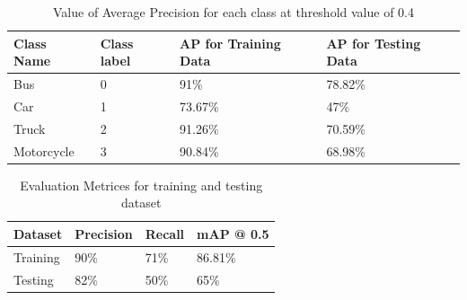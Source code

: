 \begin{table}[H]
	\caption{Value of Average Precision for each class at threshold value of 0.4}
	\label{table:5.1}
	  \begin{center}
		\scalebox{.85}
		{\begin{tabular}{|l |l |l |l |}
	    \hline
	    Class Name  & Class label  & AP for Training Data & AP for Testing Data
		\\ \hline
		Bus &  0 & 91\% & 78.82\%
		\\ \hline
		Car & 1 & 73.67\% & 47\%
		\\ \hline  
		Truck & 2 & 91.26\% & 70.59\%
		\\ \hline  
	    Motorcycle & 3 & 90.84\% & 68.98\%
	    \\ \hline 
		\end{tabular}}
	  \end{center}
\end{table}

\begin{table}[H]
	\caption{Evaluation Metrices for training and testing dataset}
	\label{table:5.2}
	  \begin{center}
		\scalebox{1}
		{\begin{tabular}{|l |l |l |l |}
	    \hline
	    Dataset   & Precision & Recall &  mAP @ 0.5
		\\ \hline
		Training & 90\% & 71\% & 86.81\%
		\\ \hline
		Testing  & 82\%& 50\% & 65\%
		\\ \hline  
		\end{tabular}}
	  \end{center}
\end{table}


